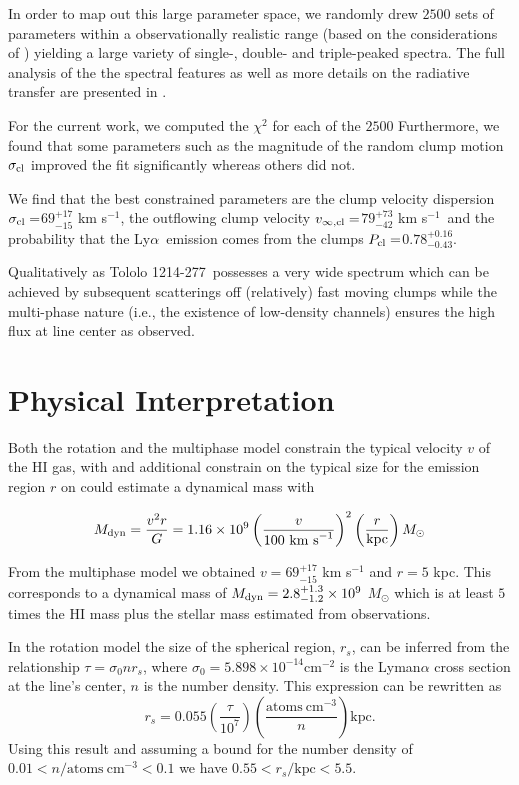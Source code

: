 \documentclass[a4paper, usenatbib, 12pt]{article}
\newcommand{\tol}{Tololo 1214-277}
\newcommand{\lya}{Ly$\alpha$}
\newcommand{\sigmaclump}{$69^{+17}_{-15}$ km s$^{-1}$}
\newcommand{\inftyclump}{$79^{+73}_{-42}$ km s$^{-1}$}
\newcommand{\probaclump}{$0.78^{+0.16}_{-0.43}$}
\begin{document}
{In order to map out this large parameter space, we randomly drew
$2500$ sets of parameters within a observationally realistic range
(based on the considerations of \cite{Laursen2013ApJ...766..124L})
yielding a large variety of single-, double- and triple-peaked
spectra. 
The full analysis of the the spectral features as well as
more details on the radiative transfer are presented in
\cite{Gronke2016}.    
 
For the current work, we computed the $\chi^2$ for each of the $2500$
Furthermore, we found that some parameters such as the magnitude of
the random clump motion $\sigma_{\rm cl}$ improved the fit
significantly whereas others did not.  

We find that the best constrained parameters are the clump velocity
dispersion $\sigma_{\rm cl}=$\sigmaclump,  the outflowing clump
velocity $v_{\infty {\rm, cl}}=$\inftyclump\ and the probability that
the \lya\ emission comes from the clumps $P_{\rm cl}=$\probaclump.

Qualitatively as \tol\ possesses a very wide spectrum which can be
achieved by subsequent scatterings off (relatively) fast moving clumps
while the multi-phase nature (i.e., the existence of low-density
channels) ensures the high flux at line center as observed.     


\section*{Physical Interpretation}

Both the rotation and the multiphase model constrain the typical
velocity $v$ of the HI gas, with and additional constrain on the typical
size for the emission region $r$ on could estimate a dynamical mass with 

\begin{equation}
M_{\rm dyn} = \frac{v^{2}r}{G} = 1.16\times10^{9}
\left(\frac{v}{100\ \mathrm{km\ s}^{-1}}\right)^2\left(\frac{r}{\mathrm{kpc}}\right) M_{\odot}
\end{equation}

From the multiphase model we obtained $v=$\sigmaclump
and $r=5$ kpc. This corresponds to a dynamical mass of $M_{\rm
  dyn}=2.8^{+1.3}_{-1.2}\times 10^{9}$ $M_{\odot}$ which is at least
$5$ times the HI mass plus the stellar mass estimated from
observations.   

In the rotation model the size of the spherical region, $r_{s}$, can
be inferred from the relationship $\tau = \sigma_0 n r_s$, where
$\sigma_0=5.898\times 10^{-14}$cm$^{-2}$ is the Lyman$\alpha$
cross section at the  line's center, $n$ is the number density. 
This expression can be rewritten as
\begin{equation}
r_{s} = 0.055 \left(\frac{\tau}{10^7}\right) \left(
\frac{\mathrm{atoms\ cm^{-3}}}{n}\right) \mathrm{kpc}.
\end{equation}
%
Using this result and assuming a bound for the number density of
$0.01<n/\mathrm{atoms\ cm^{-3}}<0.1$ we have $0.55
< r_s/\mathrm{kpc}<5.5$.

}
\end{document}
